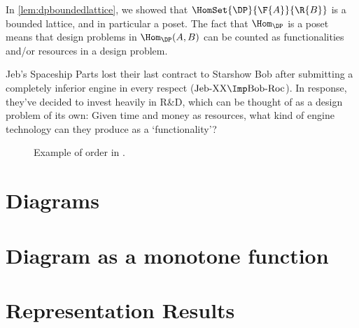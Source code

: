 

\begin{remark}
  In \cref{lem:dpboundedlattice}, we showed that $\HomSet{\DP}{\F{A}}{\R{B}}$ is a bounded lattice, and in particular a poset. The fact that $\Hom_\DP$ is a poset means that design problems in $\Hom_\DP(A,B)$ can be counted as functionalities and/or resources in a design problem.
\end{remark}

\begin{example}
  \label{ex:rd}
  Jeb's Spaceship Parts lost their last contract to Starshow Bob after submitting a completely inferior engine in every respect ($\text{Jeb-XX} \Imp \text{Bob-Roc}$). In response, they've decided to invest heavily in R\&D, which can be thought of as a design problem of its own: Given time and money as resources, what kind of engine technology can they produce as a `functionality'?
\end{example}

\begin{figure}[h!]
  \begin{center}
  \end{center}
  \caption{Example of order in \DP. \label{fig:orderdp}}
\end{figure}


\section{Diagrams}\label{sec:higher-diagrams}


\section{Diagram as a monotone function}\label{sec:higher-diagram-as-function}


\section{Representation Results}\label{sec:higher-representation}
\todo{}

